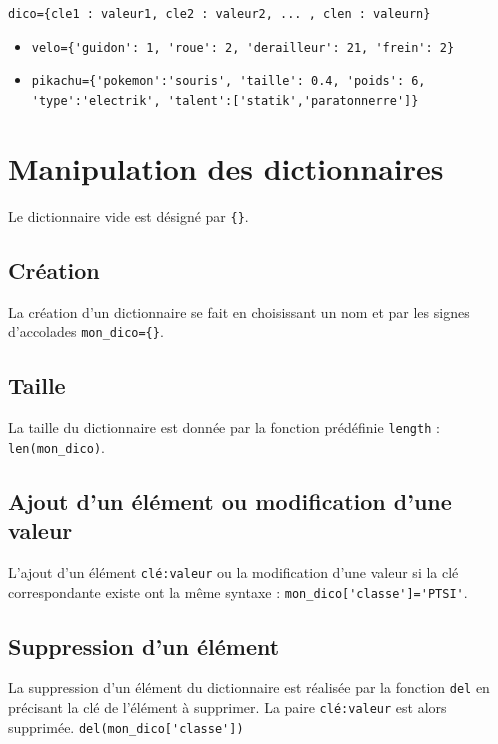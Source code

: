 \begin{center}
\texttt{dico=\{cle1 : valeur1, cle2 : valeur2, ... , clen : valeurn\}}
\end{center}

\begin{exemple}
\begin{itemize}
\item \lstinline|velo={'guidon': 1, 'roue': 2, 'derailleur': 21, 'frein': 2}|
\item \lstinline|pikachu={'pokemon':'souris', 'taille': 0.4, 'poids': 6, 'type':'electrik', 'talent':['statik','paratonnerre']}|
\end{itemize}
\end{exemple}

\section{Manipulation des dictionnaires}
Le dictionnaire vide est désigné par \texttt{\{\}}.
\subsection*{Création}
La création d'un dictionnaire se fait en choisissant un nom et par les signes d'accolades
\texttt{mon\_dico=\{\}}.

\subsection*{Taille}
La taille du dictionnaire est donnée par la fonction prédéfinie \lstinline{length} : 
\lstinline{len(mon_dico)}.


\subsection*{Ajout d'un élément ou modification d'une valeur}
L'ajout d'un élément \lstinline{clé:valeur} ou la modification d'une valeur si la clé correspondante existe ont la même syntaxe : \lstinline{mon_dico['classe']='PTSI'}. 

\subsection*{Suppression d'un élément}
La suppression d'un élément du dictionnaire est réalisée par la fonction \lstinline{del} en précisant la clé de l'élément à supprimer. La paire \lstinline{clé:valeur} est alors supprimée.
\lstinline{del(mon_dico['classe'])}


